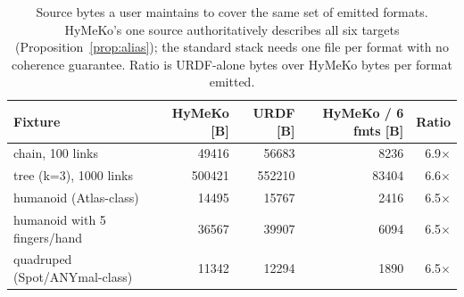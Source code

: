 \begin{table}[t]
\centering
\caption{Source bytes a user maintains to cover the same set of emitted formats. HyMeKo's one source authoritatively describes all six targets (Proposition~\ref{prop:alias}); the standard stack needs one file per format with no coherence guarantee. Ratio is URDF-alone bytes over HyMeKo bytes per format emitted.}
\label{tab:description_length}
\begin{tabular}{lrrrr}
\toprule
Fixture & HyMeKo [B] & URDF [B] & HyMeKo / 6 fmts [B] & Ratio \\
\midrule
chain, 100 links & 49416 & 56683 & 8236 & 6.9$\times$ \\
tree (k=3), 1000 links & 500421 & 552210 & 83404 & 6.6$\times$ \\
humanoid (Atlas-class) & 14495 & 15767 & 2416 & 6.5$\times$ \\
humanoid with 5 fingers/hand & 36567 & 39907 & 6094 & 6.5$\times$ \\
quadruped (Spot/ANYmal-class) & 11342 & 12294 & 1890 & 6.5$\times$ \\
\bottomrule
\end{tabular}
\end{table}